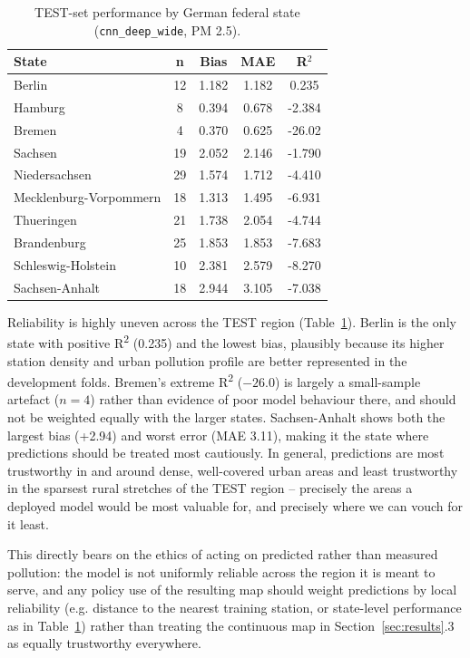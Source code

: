 \documentclass[english, a4paper, numbers=noenddot]{article}
\begin{document}
\begin{table}[h]
\centering
\caption{TEST-set performance by German federal state (\texttt{cnn\_deep\_wide}, PM 2.5).}
\label{tab:test_by_state}
\begin{tabular}{lcccc}
\hline
\textbf{State} & \textbf{n} & \textbf{Bias} & \textbf{MAE} & \textbf{R}$^2$ \\
\hline
Berlin                  & 12 & 1.182 & 1.182 & 0.235 \\
Hamburg                 & 8  & 0.394 & 0.678 & -2.384 \\
Bremen                  & 4  & 0.370 & 0.625 & -26.02 \\
Sachsen                 & 19 & 2.052 & 2.146 & -1.790 \\
Niedersachsen           & 29 & 1.574 & 1.712 & -4.410 \\
Mecklenburg-Vorpommern  & 18 & 1.313 & 1.495 & -6.931 \\
Thueringen              & 21 & 1.738 & 2.054 & -4.744 \\
Brandenburg             & 25 & 1.853 & 1.853 & -7.683 \\
Schleswig-Holstein      & 10 & 2.381 & 2.579 & -8.270 \\
Sachsen-Anhalt          & 18 & 2.944 & 3.105 & -7.038 \\
\hline
\end{tabular}
\end{table}

Reliability is highly uneven across the TEST region (Table~\ref{tab:test_by_state}). Berlin is the only state with positive R\textsuperscript{2} (0.235) and the lowest bias, plausibly because its higher station density and urban pollution profile are better represented in the development folds. Bremen's extreme R\textsuperscript{2} ($-26.0$) is largely a small-sample artefact ($n=4$) rather than evidence of poor model behaviour there, and should not be weighted equally with the larger states. Sachsen-Anhalt shows both the largest bias (+2.94) and worst error (MAE 3.11), making it the state where predictions should be treated most cautiously. In general, predictions are most trustworthy in and around dense, well-covered urban areas and least trustworthy in the sparsest rural stretches of the TEST region -- precisely the areas a deployed model would be most valuable for, and precisely where we can vouch for it least.

This directly bears on the ethics of acting on predicted rather than measured pollution: the model is not uniformly reliable across the region it is meant to serve, and any policy use of the resulting map should weight predictions by local reliability (e.g. distance to the nearest training station, or state-level performance as in Table~\ref{tab:test_by_state}) rather than treating the continuous 
map in Section~\ref{sec:results}.3 as equally trustworthy everywhere.
\end{document}
